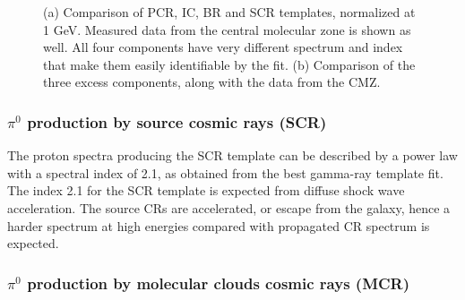 \begin{figure}[h]
\begin{minipage}[h]{0.45\textwidth}
 	  \subcaption{}
 	  \label{fig:norm_excess_component}
  \end{minipage}
  \caption{(a) Comparison of PCR, IC, BR and SCR templates, normalized at 1 GeV. Measured data from the central molecular zone is shown as well. All four components have very different spectrum and index that make them easily identifiable by the fit. (b) Comparison of the three excess components, along with the data from the CMZ.}
  \label{fig:norm_spectra} 
\end{figure}




%

\subsubsection{$\pi^0$ production by source cosmic rays (SCR)}

The proton spectra producing the SCR template can be described by a power law with a spectral index of 2.1, as obtained from the best gamma-ray template fit. The index 2.1 for the SCR template %
is expected from diffuse shock wave acceleration. \cite{Biermann10} \cite{Hillas2005} 
The source CRs are accelerated, or escape from the galaxy, hence a harder spectrum at high energies compared with propagated CR spectrum is expected.


\subsubsection{$\pi^0$ production by molecular clouds cosmic rays (MCR)}

